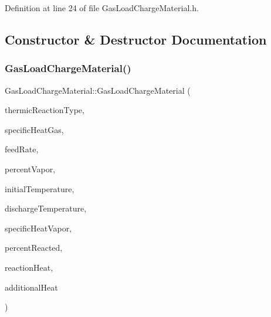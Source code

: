 Definition at line 24 of file Gas\+Load\+Charge\+Material.\+h.



\subsection{Constructor \& Destructor Documentation}
\mbox{\label{class_gas_load_charge_material_a4ad94a94d25bad9eaeca4947d879f35f}} 
\subsubsection{\texorpdfstring{Gas\+Load\+Charge\+Material()}{GasLoadChargeMaterial()}}
{\footnotesize\ttfamily Gas\+Load\+Charge\+Material\+::\+Gas\+Load\+Charge\+Material (\begin{DoxyParamCaption}\item[{const \hyperlink{namespace_load_charge_material_a51d4263e865a5d86236622dd3fe23fd1}{Load\+Charge\+Material\+::\+Thermic\+Reaction\+Type}}]{thermic\+Reaction\+Type,  }\item[{const double}]{specific\+Heat\+Gas,  }\item[{const double}]{feed\+Rate,  }\item[{const double}]{percent\+Vapor,  }\item[{const double}]{initial\+Temperature,  }\item[{const double}]{discharge\+Temperature,  }\item[{const double}]{specific\+Heat\+Vapor,  }\item[{const double}]{percent\+Reacted,  }\item[{const double}]{reaction\+Heat,  }\item[{const double}]{additional\+Heat }\end{DoxyParamCaption})\hspace{0.3cm}{\ttfamily [inline]}}

